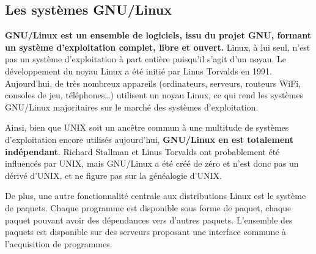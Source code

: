 \newpage

\subsection{Les systèmes GNU/Linux} \vspace{-4mm}

\textbf{GNU/Linux est un ensemble de logiciels, issu du projet GNU, formant un système d'exploitation complet, libre et ouvert.} Linux, à lui seul, n'est pas un système d'exploitation à part entière puisqu'il s'agit d'un noyau. Le développement du noyau Linux a été initié par Linus Torvalds en 1991. Aujourd'hui, de très nombreux appareils (ordinateurs, serveurs, routeurs WiFi, consoles de jeu, téléphones\dots) utilisent un noyau Linux, ce qui rend les systèmes GNU/Linux majoritaires sur le marché des systèmes d'exploitation.

Ainsi, bien que UNIX soit un ancêtre commun à une multitude de systèmes d'exploitation encore utilisés aujourd'hui, \textbf{GNU/Linux en est totalement indépendant}. Richard Stallman et Linus Torvalds ont probablement été influencés par UNIX, mais GNU/Linux a été créé de zéro et n'est donc pas un dérivé d'UNIX, et ne figure pas sur la généalogie d'UNIX.

De plus, une autre fonctionnalité centrale aux distributions Linux est le système de paquets. Chaque programme est disponible sous forme de paquet, chaque paquet pouvant avoir des dépendances vers d'autres paquets. L'ensemble des paquets est disponible sur des serveurs proposant une interface commune à l'acquisition de programmes.

